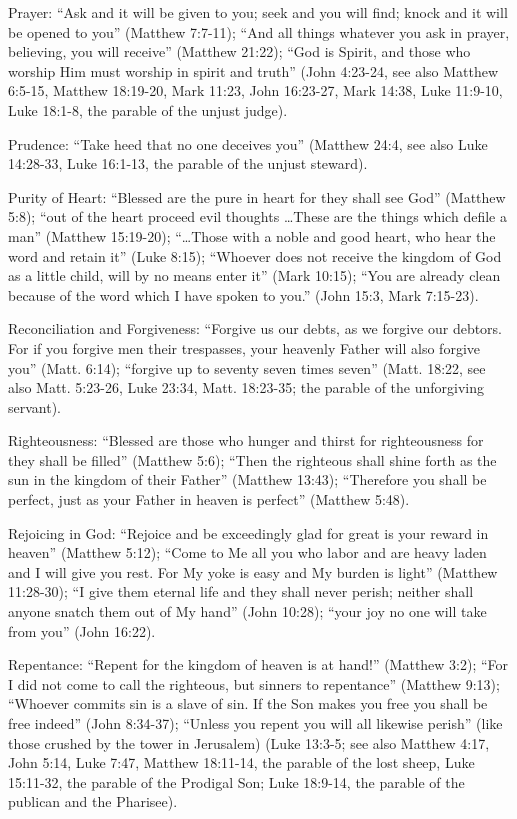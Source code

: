 Prayer: ``Ask and it will be given to you; seek and you will find; knock and it will be opened to you'' (Matthew 7:7-11); ``And all things whatever you ask in prayer, believing, you will receive'' (Matthew 21:22); ``God is Spirit, and those who worship Him must worship in spirit and truth'' (John 4:23-24, see also Matthew 6:5-15, Matthew 18:19-20, Mark 11:23, John 16:23-27, Mark 14:38, Luke 11:9-10, Luke 18:1-8, the parable of the unjust judge).

Prudence: ``Take heed that no one deceives you'' (Matthew 24:4, see also Luke 14:28-33, Luke 16:1-13, the parable of the unjust steward).

Purity of Heart: ``Blessed are the pure in heart for they shall see God'' (Matthew 5:8); ``out of the heart proceed evil thoughts \ldots  These are the things which defile a man'' (Matthew 15:19-20); ``\ldots Those with a noble and good heart, who hear the word and retain it'' (Luke 8:15); ``Whoever does not receive the kingdom of God as a little child, will by no means enter it'' (Mark 10:15); ``You are already clean because of the word which I have spoken to you.'' (John 15:3, Mark 7:15-23).

Reconciliation and Forgiveness: ``Forgive us our debts, as we forgive our debtors. For if you forgive men their trespasses, your heavenly Father will also forgive you'' (Matt. 6:14); ``forgive up to seventy seven times seven'' (Matt. 18:22, see also Matt. 5:23-26, Luke 23:34, Matt. 18:23-35; the parable of the unforgiving servant).

Righteousness: ``Blessed are those who hunger and thirst for righteousness for they shall be filled'' (Matthew 5:6); ``Then the righteous shall shine forth as the sun in the kingdom of their Father'' (Matthew 13:43); ``Therefore you shall be perfect, just as your Father in heaven is perfect'' (Matthew 5:48).

Rejoicing in God: ``Rejoice and be exceedingly glad for great is your reward in heaven'' (Matthew 5:12); ``Come to Me all you who labor and are heavy laden and I will give you rest. For My yoke is easy and My burden is light'' (Matthew 11:28-30); ``I give them eternal life and they shall never perish; neither shall anyone snatch them out of My hand'' (John 10:28); ``your joy no one will take from you'' (John 16:22).

Repentance: ``Repent for the kingdom of heaven is at hand!'' (Matthew 3:2); ``For I did not come to call the righteous, but sinners to repentance'' (Matthew 9:13); ``Whoever commits sin is a slave of sin. If the Son makes you free you shall be free indeed'' (John 8:34-37); ``Unless you repent you will all likewise perish'' (like those crushed by the tower in Jerusalem) (Luke 13:3-5; see also Matthew 4:17, John 5:14, Luke 7:47, Matthew 18:11-14, the parable of the lost sheep, Luke 15:11-32, the parable of the Prodigal Son; Luke 18:9-14, the parable of the publican and the Pharisee).

